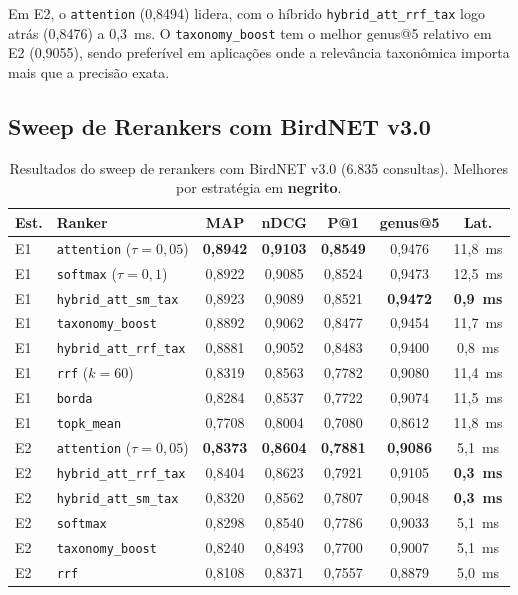 \documentclass[12pt]{article}
\begin{document}
Em E2, o \texttt{attention} (0,8494) lidera, com o híbrido
\texttt{hybrid\_att\_rrf\_tax} logo atrás (0,8476) a 0,3~ms. O
\texttt{taxonomy\_boost} tem o melhor genus@5 relativo em E2 (0,9055),
sendo preferível em aplicações onde a relevância taxonômica importa mais
que a precisão exata.

\subsection{Sweep de Rerankers com BirdNET v3.0}

\begin{table}[H]
\centering
\caption{Resultados do sweep de rerankers com BirdNET v3.0 (6.835 consultas).
Melhores por estratégia em \textbf{negrito}.}
\label{tab:sweep_birdnet}
\begin{tabular}{llccccc}
\toprule
\textbf{Est.} & \textbf{Ranker} & \textbf{MAP} & \textbf{nDCG} & \textbf{P@1} & \textbf{genus@5} & \textbf{Lat.} \\
\midrule
E1 & \texttt{attention} ($\tau=0{,}05$)   & \textbf{0,8942} & \textbf{0,9103} & \textbf{0,8549} & 0,9476 & 11,8~ms \\
E1 & \texttt{softmax} ($\tau=0{,}1$)      & 0,8922 & 0,9085 & 0,8524 & 0,9473 & 12,5~ms \\
E1 & \texttt{hybrid\_att\_sm\_tax}         & 0,8923 & 0,9089 & 0,8521 & \textbf{0,9472} & \textbf{0,9~ms} \\
E1 & \texttt{taxonomy\_boost}             & 0,8892 & 0,9062 & 0,8477 & 0,9454 & 11,7~ms \\
E1 & \texttt{hybrid\_att\_rrf\_tax}        & 0,8881 & 0,9052 & 0,8483 & 0,9400 & 0,8~ms \\
E1 & \texttt{rrf} ($k=60$)                & 0,8319 & 0,8563 & 0,7782 & 0,9080 & 11,4~ms \\
E1 & \texttt{borda}                        & 0,8284 & 0,8537 & 0,7722 & 0,9074 & 11,5~ms \\
E1 & \texttt{topk\_mean}                   & 0,7708 & 0,8004 & 0,7080 & 0,8612 & 11,8~ms \\
\midrule
E2 & \texttt{attention} ($\tau=0{,}05$)   & \textbf{0,8373} & \textbf{0,8604} & \textbf{0,7881} & \textbf{0,9086} & 5,1~ms \\
E2 & \texttt{hybrid\_att\_rrf\_tax}        & 0,8404 & 0,8623 & 0,7921 & 0,9105 & \textbf{0,3~ms} \\
E2 & \texttt{hybrid\_att\_sm\_tax}         & 0,8320 & 0,8562 & 0,7807 & 0,9048 & \textbf{0,3~ms} \\
E2 & \texttt{softmax}                      & 0,8298 & 0,8540 & 0,7786 & 0,9033 & 5,1~ms \\
E2 & \texttt{taxonomy\_boost}             & 0,8240 & 0,8493 & 0,7700 & 0,9007 & 5,1~ms \\
E2 & \texttt{rrf}                          & 0,8108 & 0,8371 & 0,7557 & 0,8879 & 5,0~ms \\
\bottomrule
\end{tabular}
\end{table}
\end{document}
